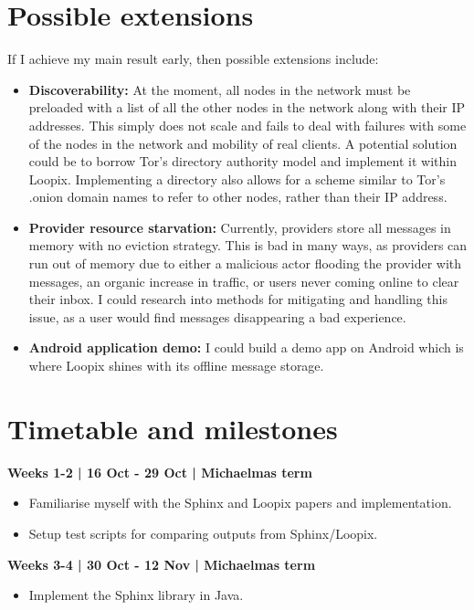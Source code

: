 \documentclass[12pt,a4paper,twoside]{article}
\begin{document}
	
	\section*{Possible extensions}
	
	If I achieve my main result early, then possible extensions include:
	
	\begin{itemize}
		\item \textbf{Discoverability:} At the moment, all nodes in the network must be preloaded with a list of all the other nodes in the network along with their IP addresses. This simply does not scale and fails to deal with failures with some of the nodes in the network and mobility of real clients. A potential solution could be to borrow Tor's directory authority model and implement it within Loopix. Implementing a directory also allows for a scheme similar to Tor's .onion domain names to refer to other nodes, rather than their IP address.
		\item \textbf{Provider resource starvation:} Currently, providers store all messages in memory with no eviction strategy. This is bad in many ways, as providers can run out of memory due to either a malicious actor flooding the provider with messages, an organic increase in traffic, or users never coming online to clear their inbox. I could research into methods for mitigating and handling this issue, as a user would find messages disappearing a bad experience.
		\item \textbf{Android application demo:} I could build a demo app on Android which is where Loopix shines with its offline message storage.
	\end{itemize}
	
	
	\section*{Timetable and milestones}
	
	\textbf{Weeks 1-2 | 16 Oct - 29 Oct | Michaelmas term}
	
	\begin{itemize}
		\item Familiarise myself with the Sphinx and Loopix papers and implementation.
		\item Setup test scripts for comparing outputs from Sphinx/Loopix.
	\end{itemize}
	
	\textbf{Weeks 3-4 | 30 Oct - 12 Nov | Michaelmas term}
	
	\begin{itemize}
		\item Implement the Sphinx library in Java.
	\end{itemize}
	
\end{document}
